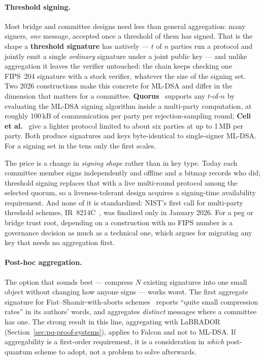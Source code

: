 \paragraph{Threshold signing.}
Most bridge and committee designs need less than general aggregation: many
signers, \emph{one} message, accepted once a threshold of them has signed. That
is the shape a \textbf{threshold signature} has natively --- $t$ of $n$ parties
run a protocol and jointly emit a single \emph{ordinary} signature under a joint
public key --- and unlike aggregation it leaves the verifier untouched: the
chain keeps checking one FIPS~204 signature with a stock verifier, whatever the
size of the signing set. Two 2026 constructions make this concrete for ML-DSA
and differ in the dimension that matters for a committee.
\textbf{Quorus}~\cite{quorus2025} supports any $t$-of-$n$ by evaluating the
ML-DSA signing algorithm inside a multi-party computation, at roughly
$100$\,kB of communication per party per rejection-sampling round;
\textbf{Celi et al.}~\cite{thresholdmldsa2026} give a lighter protocol limited to
about six parties at up to 1\,MB per party. Both produce signatures and keys
byte-identical to single-signer ML-DSA. For a signing set in the tens only the
first scales.

The price is a change in \emph{signing shape} rather than in key type. Today
each committee member signs independently and offline and a bitmap records who
did; threshold signing replaces that with a live multi-round protocol among the
selected quorum, so a liveness-tolerant design acquires a signing-time
availability requirement. And none of it is standardized: NIST's first call for
multi-party threshold schemes, IR~8214C~\cite{nistthreshold}, was finalized only
in January 2026. For a peg or bridge trust root, depending on a construction
with no FIPS number is a governance decision as much as a technical one, which
argues for migrating any key that needs no aggregation first.

\paragraph{Post-hoc aggregation.}
The option that sounds best --- compress $N$ existing signatures into one small
object without changing how anyone signs --- works worst. The first aggregate
signature for Fiat--Shamir-with-aborts schemes~\cite{boudgousttakahashi2023}
reports ``quite small compression rates'' in its authors' words, and aggregates
\emph{distinct} messages where a committee has one. The strong result in this
line, aggregating with LaBRADOR (Section~\ref{sec:pq-proof-systems}), applies
to Falcon and not to ML-DSA. If aggregability is a first-order requirement, it
is a consideration in \emph{which} post-quantum scheme to adopt, not a problem
to solve afterwards.

